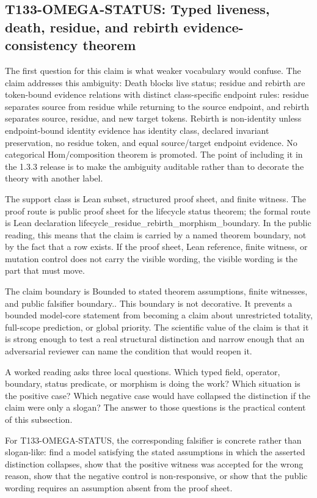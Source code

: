 \subsection{T133-OMEGA-STATUS: Typed liveness, death, residue, and rebirth evidence-consistency theorem}
The first question for this claim is what weaker vocabulary would confuse. The claim addresses this ambiguity: Death blocks live status; residue and rebirth are token-bound evidence relations with distinct class-specific endpoint rules: residue separates source from residue while returning to the source endpoint, and rebirth separates source, residue, and new target tokens. Rebirth is non-identity unless endpoint-bound identity evidence has identity class, declared invariant preservation, no residue token, and equal source/target endpoint evidence. No categorical Hom/composition theorem is promoted. The point of including it in the 1.3.3 release is to make the ambiguity auditable rather than to decorate the theory with another label.

The support class is Lean subset, structured proof sheet, and finite witness. The proof route is public proof sheet for the lifecycle status theorem; the formal route is Lean declaration lifecycle\_residue\_rebirth\_morphism\_boundary. In the public reading, this means that the claim is carried by a named theorem boundary, not by the fact that a row exists. If the proof sheet, Lean reference, finite witness, or mutation control does not carry the visible wording, the visible wording is the part that must move.

The claim boundary is Bounded to stated theorem assumptions, finite witnesses, and public falsifier boundary.. This boundary is not decorative. It prevents a bounded model-core statement from becoming a claim about unrestricted totality, full-scope prediction, or global priority. The scientific value of the claim is that it is strong enough to test a real structural distinction and narrow enough that an adversarial reviewer can name the condition that would reopen it.

A worked reading asks three local questions. Which typed field, operator, boundary, status predicate, or morphism is doing the work? Which situation is the positive case? Which negative case would have collapsed the distinction if the claim were only a slogan? The answer to those questions is the practical content of this subsection.

For T133-OMEGA-STATUS, the corresponding falsifier is concrete rather than slogan-like: find a model satisfying the stated assumptions in which the asserted distinction collapses, show that the positive witness was accepted for the wrong reason, show that the negative control is non-responsive, or show that the public wording requires an assumption absent from the proof sheet.

